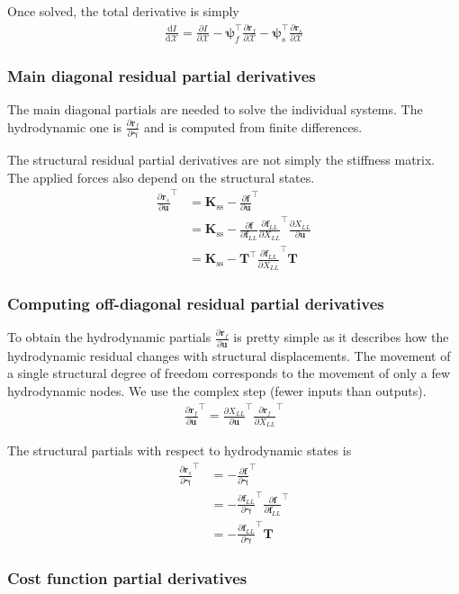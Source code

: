\documentclass[10pt]{article}
\newcommand{\pp}[2]{\frac{\partial #1}{\partial #2}}
\newcommand{\dd}[2]{\frac{\textrm{d} #1}{\textrm{d} #2}}
\newcommand{\mb}[1]{\boldsymbol{\mathbf{#1}}} %
\newcommand{\mbf}[1]{\mathbf{#1}}
\newcommand{\mcal}[1]{\mathcal{#1}} %
\newcommand{\beq}{\begin{equation}\begin{aligned}}
\newcommand{\eeq}{\end{aligned}\end{equation}}
\newcommand{\tn}[1]{\textrm{#1}}
\begin{document}
Once solved, the total derivative is simply
\beq
\dd{I}{\mcal{X}} = \pp{I}{\mcal{X}} - \mb{\psi}_f^\top \pp{\mb{r}_f}{\mcal{X}} - \mb{\psi}_s^\top \pp{\mb{r}_s}{\mcal{X}}
\eeq

\subsubsection{Main diagonal residual partial derivatives}

The main diagonal partials are needed to solve the individual systems.
The hydrodynamic one is $\pp{\mb{r}_f}{\mb{\gamma}}$ and is computed from finite differences.

The structural residual partial derivatives are not simply the stiffness matrix.
The applied forces also depend on the structural states.
\beq
\pp{\mb{r}_s}{\mb{u}}^\top &= 
\mb{K}_\tn{ss} - \pp{\mb{f}}{\mb{u}}^\top
\\
&=\mb{K}_\tn{ss} - \pp{\mb{f}}{\mb{f}_{LL}}\pp{\mb{f}_{LL}}{X_{LL}}^\top
\pp{X_{LL}}{\mb{u}}
\\
&=\mb{K}_\tn{ss} - \mb{T}^\top\pp{\mb{f}_{LL}}{X_{LL}}^\top\mb{T}
\eeq

\subsubsection{Computing off-diagonal residual partial derivatives}

To obtain the hydrodynamic partials $\pp{\mb{r}_f}{\mb{u}}$ is pretty simple as it describes how the hydrodynamic residual changes with structural displacements.
The movement of a single structural degree of freedom corresponds to the movement of only a few hydrodynamic nodes.
We use the complex step (fewer inputs than outputs).
\beq
\pp{\mb{r}_f}{\mb{u}}^\top =
\pp{X_{LL}}{\mb{u}}^\top
\pp{\mb{r}_f}{X_{LL}}^\top
\eeq

The structural partials with respect to hydrodynamic states is
\beq
\pp{\mb{r}_s}{\mb{\gamma}}^\top & = -\pp{\mbf{f}}{\mb{\gamma}}^\top
\\
& = -\pp{\mbf{f}_{LL}}{\mb{\gamma}}^\top \pp{\mb{f}}{\mb{f}_{LL}}^\top 
\\
&=-\pp{\mbf{f}_{LL}}{\mb{\gamma}}^\top \mb{T}
\eeq

\subsubsection{Cost function partial derivatives}
\end{document}
